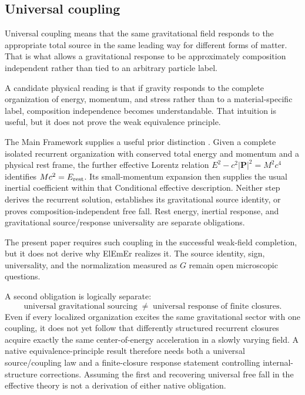 \documentclass[11pt]{article}
\newcommand{\ElEmEr}{\mbox{ElEmEr}}
\theoremstyle{plain}
\theoremstyle{remark}
\begin{document}
\subsection{Universal coupling}
\label{sec:universal}

Universal coupling means that the same gravitational field responds to the appropriate
total source in the same leading way for different forms of matter.  That is what allows
a gravitational response to be approximately composition independent rather than tied
to an arbitrary particle label.

A candidate physical reading is that if gravity responds to the complete organization of
energy, momentum, and stress rather than to a material-specific label, composition
independence becomes understandable.  That intuition is useful, but it does not prove the
weak equivalence principle.

The Main Framework supplies a useful prior distinction
\cite{CmotionMainFramework2026}.  Given a complete isolated recurrent
organization with conserved total energy and momentum and a physical rest
frame, the further effective Lorentz relation
$E^2-c^2|\mathbf P|^2=M^2c^4$ identifies $Mc^2=E_{\rm rest}$.
Its small-momentum expansion then supplies the usual inertial coefficient
within that Conditional effective description.  Neither step derives the
recurrent solution, establishes its gravitational source identity, or proves
composition-independent free fall.  Rest energy, inertial response, and
gravitational source/response universality are separate obligations.

The present paper requires such coupling in the successful weak-field completion, but it
does not derive why \ElEmEr{} realizes it.  The source identity, sign, universality, and
the normalization measured as $G$ remain open microscopic questions.

A second obligation is logically separate:
\begin{equation}
\boxed{
\text{universal gravitational sourcing}
\;\neq\;
\text{universal response of finite closures}.}
\label{eq:sourcing-vs-response}
\end{equation}
Even if every localized organization excites the same gravitational sector with one coupling,
it does not yet follow that differently structured recurrent closures acquire exactly the same
center-of-energy acceleration in a slowly varying field.  A native equivalence-principle
result therefore needs both a universal source/coupling law and a finite-closure response
statement controlling internal-structure corrections.  Assuming the first and recovering
universal free fall in the effective theory is not a derivation of either native obligation.
\end{document}
